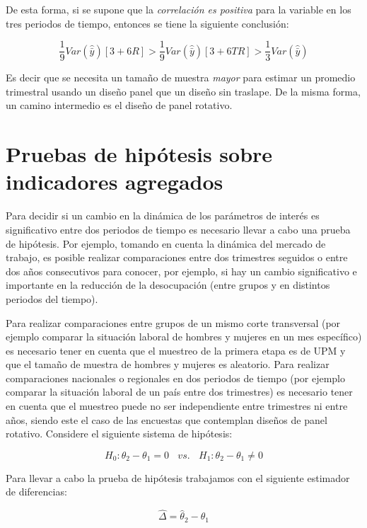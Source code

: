 \documentclass[
  12pt,
  spanish,
]{book}
\begin{document}
De esta forma, si se supone que la \emph{correlación es positiva} para la
variable en los tres periodos de tiempo, entonces se tiene la siguiente
conclusión:

\[
\frac{1}{9} Var(\hat{\bar{y}}) [3+6R] > \frac{1}{9} Var(\hat{\bar{y}}) [3+6TR] > \frac{1}{3} Var(\hat{\bar{y}})
\]

Es decir que se necesita un tamaño de muestra \emph{mayor} para estimar un
promedio trimestral usando un diseño panel que un diseño sin traslape. De la misma forma, un camino intermedio es el diseño de panel rotativo.

\hypertarget{pruebas-de-hipuxf3tesis-sobre-indicadores-agregados}{%
\section{Pruebas de hipótesis sobre indicadores agregados}\label{pruebas-de-hipuxf3tesis-sobre-indicadores-agregados}}

Para decidir si un cambio en la dinámica de los parámetros de interés es
significativo entre dos periodos de tiempo es necesario llevar a cabo
una prueba de hipótesis. Por ejemplo, tomando en cuenta la dinámica del
mercado de trabajo, es posible realizar comparaciones entre dos
trimestres seguidos o entre dos años consecutivos para conocer, por
ejemplo, si hay un cambio significativo e importante en la reducción de
la desocupación (entre grupos y en distintos periodos del tiempo).

Para realizar comparaciones entre grupos de un mismo corte transversal
(por ejemplo comparar la situación laboral de hombres y mujeres en un
mes específico) es necesario tener en cuenta que el muestreo de la
primera etapa es de UPM y que el tamaño de muestra de hombres y mujeres
es aleatorio. Para realizar comparaciones nacionales o regionales en dos
periodos de tiempo (por ejemplo comparar la situación laboral de un país
entre dos trimestres) es necesario tener en cuenta que el muestreo puede
no ser independiente entre trimestres ni entre años, siendo este el caso
de las encuestas que contemplan diseños de panel rotativo. Considere el
siguiente sistema de hipótesis:

\[
H_0: \theta_2 - \theta_1 = 0 \ \ \ \ vs. \ \ \ \ H_1: \theta_2 - \theta_1 \neq 0
\]

Para llevar a cabo la prueba de hipótesis trabajamos con el siguiente
estimador de diferencias:

\[
\hat{\Delta} = \hat{\theta}_2 - \hat{\theta}_1
\]
\end{document}
